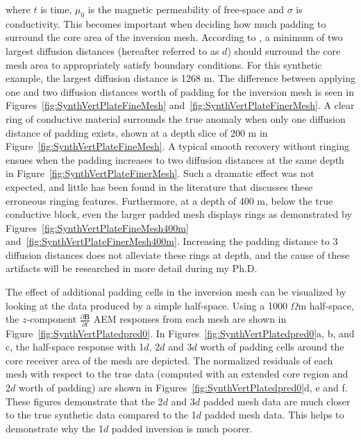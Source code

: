 \documentclass[letterpaper,11pt]{article}
\begin{document}
where $ t $ is time, $ \mu_0 $ is the magnetic permeability of free-space and $ \sigma $ is conductivity. This becomes important when deciding how much padding to surround the core area of the inversion mesh. According to \cite{Yang2012}, a minimum of two largest diffusion distances (hereafter referred to as $ \mathit{d} $) should surround the core mesh area to appropriately satisfy boundary conditions. For this synthetic example, the largest diffusion distance is 1268 m. The difference between applying one and two diffusion distances worth of padding for the inversion mesh is seen in Figures~\ref{fig:SynthVertPlateFineMesh} and~\ref{fig:SynthVertPlateFinerMesh}. A clear ring of conductive material surrounds the true anomaly when only one diffusion distance of padding exists, shown at a depth slice of 200 m in Figure~\ref{fig:SynthVertPlateFineMesh}. A typical smooth recovery without ringing ensues when the padding increases to two diffusion distances at the same depth in Figure~\ref{fig:SynthVertPlateFinerMesh}. Such a dramatic effect was not expected, and little has been found in the literature that discusses these erroneous ringing features. Furthermore, at a depth of 400 m, below the true conductive block, even the larger padded mesh displays rings as demonstrated by Figures~\ref{fig:SynthVertPlateFineMesh400m} and~\ref{fig:SynthVertPlateFinerMesh400m}. Increasing the padding distance to 3 diffusion distances does not alleviate these rings at depth, and the cause of these artifacts will be researched in more detail during my Ph.D. 

The effect of additional padding cells in the inversion mesh can be visualized by looking at the data produced by a simple half-space. Using a 1000 $ \Omega $m half-space, the $ z $-component $\frac{\partial\mathbf{B}}{\partial t} $ AEM responses from each mesh are shown in Figure~\ref{fig:SynthVertPlatedpred0}.  In Figures~\ref{fig:SynthVertPlatedpred0}a, b, and c, the half-space response with 1$ \mathit{d} $, 2$ \mathit{d} $ and 3$ \mathit{d} $ worth of padding cells around the core receiver area of the mesh are depicted. The normalized residuals of each mesh with respect to the true data (computed with an extended core region and 2$ \mathit{d} $ worth of padding) are shown in Figures~\ref{fig:SynthVertPlatedpred0}d, e and f. These figures demonstrate that the 2$ \mathit{d} $ and 3$ \mathit{d} $ padded mesh data are much closer to the true synthetic data compared to the 1$ \mathit{d} $ padded mesh data. This helps to demonstrate why the 1$ \mathit{d} $ padded inversion is much poorer.
\end{document}

